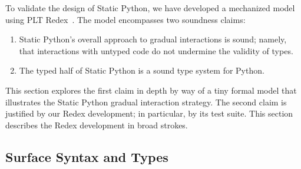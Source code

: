 \documentclass[english,cleveref,submission]{programming}
\newcommand{\SP}{Static Python}
\begin{document}



To validate the design of \SP{}, we have developed a mechanized model using PLT
Redex~\cite{kcdeffmrtf-popl-2012}.
The model encompasses two soundness claims:
\begin{enumerate}
  \item
    \SP{}'s overall approach to gradual interactions is sound; namely, that interactions
    with untyped code do not undermine the validity of types.
  \item
    The typed half of \SP{} is a sound type system for Python.
\end{enumerate}
This section explores the first claim in depth by way of a tiny formal model
that illustrates the \SP{} gradual interaction strategy.
The second claim is justified by our Redex development;
in particular, by its test suite.
This section describes the Redex development in broad strokes.


\subsection{Surface Syntax and Types}
\end{document}
